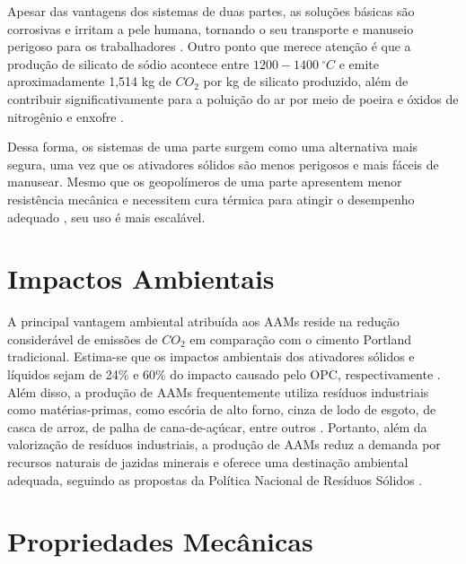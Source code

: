 Apesar das vantagens dos sistemas de duas partes, as soluções básicas são corrosivas e irritam a pele humana, tornando o seu transporte e manuseio perigoso para os trabalhadores \cite{awoyera2019critical}.
Outro ponto que merece atenção é que a produção de silicato de sódio acontece entre $1200-1400\ ^\circ C$ e emite aproximadamente 1,514 kg de $CO_2$ por kg de silicato produzido, além de contribuir significativamente para a poluição do ar por meio de poeira e óxidos de nitrogênio e enxofre \cite{rajan2020sustainable}.

Dessa forma, os sistemas de uma parte surgem como uma alternativa mais segura, uma vez que os ativadores sólidos são menos perigosos e mais fáceis de manusear. Mesmo que os geopolímeros de uma parte apresentem menor resistência mecânica e necessitem cura térmica para atingir o desempenho adequado \cite{provis2018alkali}, seu uso é mais escalável.

\section{Impactos Ambientais}

A principal vantagem ambiental atribuída aos AAMs reside na redução considerável de emissões de $CO_2$ em comparação com o cimento Portland tradicional.
Estima-se que os impactos ambientais dos ativadores sólidos e líquidos sejam de 24\% e 60\% do impacto causado pelo OPC, respectivamente \cite{luukkonen2017review}.
Além disso, a produção de AAMs frequentemente utiliza resíduos industriais como matérias-primas, como escória de alto forno, cinza de lodo de esgoto, de casca de arroz, de palha de cana-de-açúcar, entre outros \cite{moraes2024scsa}.
Portanto, além da valorização de resíduos industriais, a produção de AAMs reduz a demanda por recursos naturais de jazidas minerais e oferece uma destinação ambiental adequada, seguindo as propostas da Política Nacional de Resíduos Sólidos \cite{PNRS2016}.

\section{Propriedades Mecânicas}

